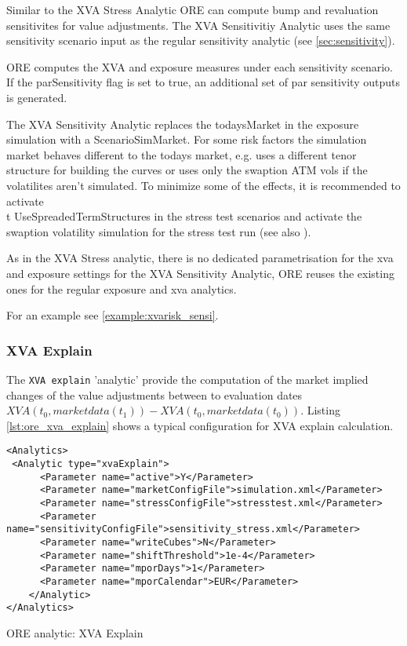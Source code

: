 {Similar to the XVA Stress Analytic ORE can compute bump and revaluation sensitivites for value adjustments.
The XVA Sensitivitiy Analytic uses the same sensitivity scenario input as the regular sensitivity analytic
(see \ref{sec:sensitivity}).

ORE computes the XVA and exposure measures under each sensitivity scenario. If the parSensitivity flag is set to true,
an additional set of par sensitivity outputs is generated.

The XVA Sensitivity Analytic replaces the todaysMarket in the exposure simulation with a ScenarioSimMarket. 
For some risk factors the simulation market behaves different to the todays market, e.g. uses a different tenor
structure for building the curves or uses only the swaption ATM vols if  the volatilites aren't simulated.
To minimize some of the effects, it is recommended to activate {\\t UseSpreadedTermStructures} in the stress test
scenarios  and activate the swaption volatility simulation for the stress test run (see also \cite{methods}).

As in the XVA Stress analytic, there is no dedicated parametrisation for the xva and exposure settings for the
XVA Sensitivity Analytic, ORE reuses the existing ones for the regular exposure and xva analytics.

For an example see \ref{example:xvarisk_sensi}.

\subsubsection{XVA Explain}

The {\tt XVA explain} 'analytic' provide the computation of the market implied changes of the value adjustments 
between to evaluation dates $XVA(t_0, marketdata(t_1)) - XVA(t_0, marketdata(t_0))$. Listing \ref{lst:ore_xva_explain}
shows a typical configuration for XVA explain calculation.

\begin{listing}[H]
\begin{verbatim}
<Analytics>
 <Analytic type="xvaExplain">
      <Parameter name="active">Y</Parameter>
      <Parameter name="marketConfigFile">simulation.xml</Parameter>
      <Parameter name="stressConfigFile">stresstest.xml</Parameter>
      <Parameter name="sensitivityConfigFile">sensitivity_stress.xml</Parameter>
      <Parameter name="writeCubes">N</Parameter>
      <Parameter name="shiftThreshold">1e-4</Parameter>
      <Parameter name="mporDays">1</Parameter>
      <Parameter name="mporCalendar">EUR</Parameter>
    </Analytic>
</Analytics>
\end{verbatim}
\caption{ORE analytic: XVA Explain}
\label{lst:ore_xva_explain}
\end{listing}

}
